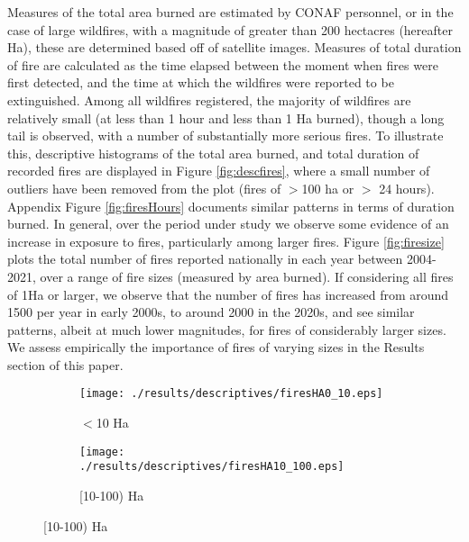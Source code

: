\documentclass[11pt]{article}
\begin{document}
\begin{spacing}{1.3}
Measures of the total area burned are estimated by CONAF personnel, or in the case of large wildfires, with a magnitude of greater than 200 hectacres (hereafter Ha), these are determined based off of satellite images. Measures of total duration of fire are calculated as the time elapsed between the moment when fires were first detected, and the time at which the wildfires were reported to be extinguished.  Among all wildfires registered, the majority of wildfires are relatively small (at less than 1 hour and less than 1 Ha burned), though a long tail is observed, with a number of substantially more serious fires.  To illustrate this, descriptive histograms of the total area burned, and total duration of recorded fires are displayed in Figure \ref{fig:descfires}, where a small number of outliers have been removed from the plot (fires of $>$100 ha or $>$ 24 hours).  Appendix Figure \ref{fig:firesHours} documents similar patterns in terms of duration burned.  
In general, over the period under study we observe some evidence of an increase in exposure to fires, particularly among larger fires.  Figure \ref{fig:firesize} plots the total number of fires reported nationally in each year between 2004-2021, over a range of fire sizes (measured by area burned).  If considering all fires of 1Ha or larger, we observe that the number of fires has increased from around 1500 per year in early 2000s, to around 2000 in the 2020s, and see similar patterns, albeit at much lower magnitudes, for fires of considerably larger sizes.  We assess empirically the importance of fires of varying sizes in the Results section of this paper.



\begin{figure}[htpb!]
    \centering
    \caption{Wildfire Exposures by Magnitude of Fire}
    \label{fig:descfires}
    \begin{subfigure}{0.49\textwidth}
          \texttt{[image: ./results/descriptives/firesHA0\_10.eps]}
         \caption{$<$10 Ha}
    \end{subfigure}
    \begin{subfigure}{0.49\textwidth}
          \texttt{[image: ./results/descriptives/firesHA10\_100.eps]}
         \caption{[10-100) Ha}
    \end{subfigure}


\end{figure}
\end{spacing}
\end{document}
